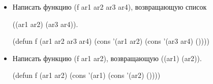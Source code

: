 \begin{itemize}
	\item Написать функцию (f ar1 ar2 ar3 ar4), возвращающую список 
	
	((ar1 ar2) (ar3 ar4)).
	
	(defun f (ar1 ar2 ar3 ar4) (cons '(ar1 ar2) (cons '(ar3 ar4) ())))
	
	\begin{figure}[H]
	\end{figure} 
	
	\item Написать функцию (f ar1 ar2), возвращающую ((ar1) (ar2)).
	
	(defun f (ar1 ar2) (cons '(ar1) (cons '(ar2) ())))
	

\end{itemize}
